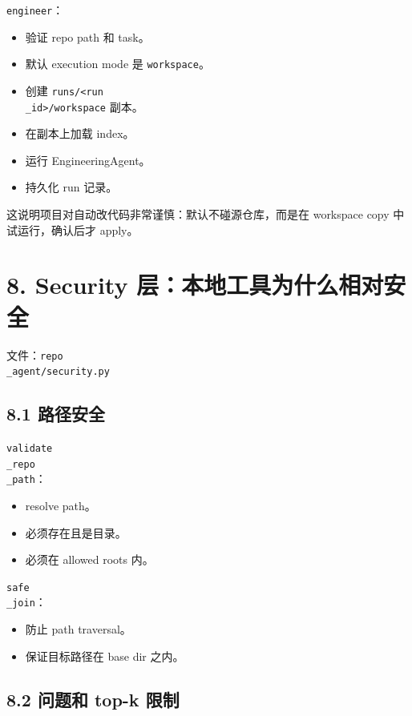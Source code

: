 \documentclass[UTF8,12pt,openany]{ctexbook}
\begin{document}
\texttt{engineer}：\par

\begin{itemize}
\item 验证 repo path 和 task。
\item 默认 execution mode 是 \texttt{workspace}。
\item 创建 \texttt{runs/<run\\_id>/workspace} 副本。
\item 在副本上加载 index。
\item 运行 EngineeringAgent。
\item 持久化 run 记录。
\end{itemize}

这说明项目对自动改代码非常谨慎：默认不碰源仓库，而是在 workspace copy 中试运行，确认后才 apply。\par

\section{8. Security 层：本地工具为什么相对安全}

文件：\texttt{repo\\_agent/security.py}\par

\subsection{8.1 路径安全}

\texttt{validate\\_repo\\_path}：\par

\begin{itemize}
\item resolve path。
\item 必须存在且是目录。
\item 必须在 allowed roots 内。
\end{itemize}

\texttt{safe\\_join}：\par

\begin{itemize}
\item 防止 path traversal。
\item 保证目标路径在 base dir 之内。
\end{itemize}

\subsection{8.2 问题和 top-k 限制}
\end{document}
